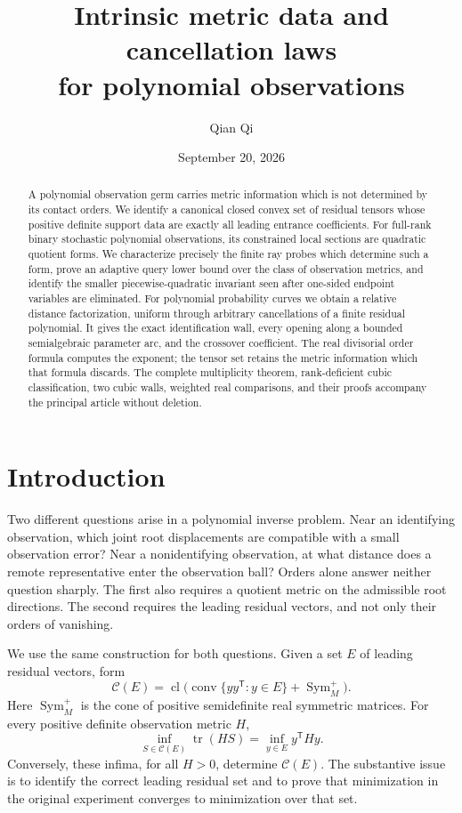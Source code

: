 \documentclass[11pt,reqno]{amsart}
\title[Metric data and cancellation laws]{Intrinsic metric data and cancellation laws\\ for polynomial observations}
\author{Qian Qi}
\date{September 20, 2026}
\numberwithin{equation}{section}
\theoremstyle{definition}
\theoremstyle{remark}
\newcommand{\Sym}{\operatorname{Sym}}
\newcommand{\tr}{\operatorname{tr}}
\newcommand{\cl}{\operatorname{cl}}
\begin{document}
\begin{abstract}
A polynomial observation germ carries metric information which is not determined by its contact orders. We identify a canonical closed convex set of residual tensors whose positive definite support data are exactly all leading entrance coefficients. For full-rank binary stochastic polynomial observations, its constrained local sections are quadratic quotient forms. We characterize precisely the finite ray probes which determine such a form, prove an adaptive query lower bound over the class of observation metrics, and identify the smaller piecewise-quadratic invariant seen after one-sided endpoint variables are eliminated. For polynomial probability curves we obtain a relative distance factorization, uniform through arbitrary cancellations of a finite residual polynomial. It gives the exact identification wall, every opening along a bounded semialgebraic parameter arc, and the crossover coefficient. The real divisorial order formula computes the exponent; the tensor set retains the metric information which that formula discards. The complete multiplicity theorem, rank-deficient cubic classification, two cubic walls, weighted real comparisons, and their proofs accompany the principal article without deletion.
\end{abstract}
\maketitle

\section{Introduction}
Two different questions arise in a polynomial inverse problem. Near an identifying observation, which joint root displacements are compatible with a small observation error? Near a nonidentifying observation, at what distance does a remote representative enter the observation ball? Orders alone answer neither question sharply. The first also requires a quotient metric on the admissible root directions. The second requires the leading residual vectors, and not only their orders of vanishing.

We use the same construction for both questions. Given a set $E$ of leading residual vectors, form
\begin{equation}\label{eq:intro-envelope}
 \mathcal C(E)=\cl\bigl(\operatorname{conv}\{yy^{\mathsf T}:y\in E\}
                                      +\Sym_M^+\bigr).
\end{equation}
Here $\Sym_M^+$ is the cone of positive semidefinite real symmetric matrices. For every positive definite observation metric $H$,
\[
 \inf_{S\in\mathcal C(E)}\tr(HS)=\inf_{y\in E}y^{\mathsf T}Hy.
\]
Conversely, these infima, for all $H>0$, determine $\mathcal C(E)$. The substantive issue is to identify the correct leading residual set and to prove that minimization in the original experiment converges to minimization over that set.
\end{document}
